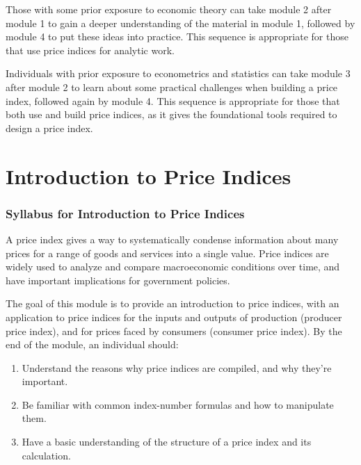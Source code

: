 \documentclass[
]{article}
\begin{document}
Those with some prior exposure to economic theory can take module 2 after module 1 to gain a deeper understanding of the material in module 1, followed by module 4 to put these ideas into practice. This sequence is appropriate for those that use price indices for analytic work.

Individuals with prior exposure to econometrics and statistics can take module 3 after module 2 to learn about some practical challenges when building a price index, followed again by module 4. This sequence is appropriate for those that both use and build price indices, as it gives the foundational tools required to design a price index.

\hypertarget{part-introduction-to-price-indices}{%
\part{Introduction to Price Indices}\label{part-introduction-to-price-indices}}

\hypertarget{syllabus-for-introduction-to-price-indices}{%
\section{Syllabus for Introduction to Price Indices}\label{syllabus-for-introduction-to-price-indices}}

A price index gives a way to systematically condense information about many prices for a range of goods and services into a single value. Price indices are widely used to analyze and compare macroeconomic conditions over time, and have important implications for government policies.

The goal of this module is to provide an introduction to price indices, with an application to price indices for the inputs and outputs of production (producer price index), and for prices faced by consumers (consumer price index). By the end of the module, an individual should:

\begin{enumerate}
\def\labelenumi{\arabic{enumi}.}
\item
  Understand the reasons why price indices are compiled, and why they're important.
\item
  Be familiar with common index-number formulas and how to manipulate them.
\item
  Have a basic understanding of the structure of a price index and its calculation.
\end{enumerate}
\end{document}
